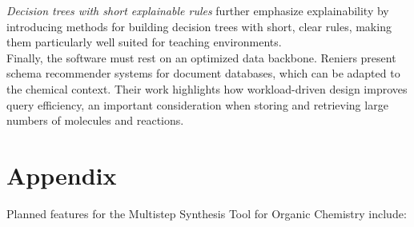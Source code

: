 \documentclass[12pt]{article}
\begin{document}
\textit{Decision trees with short explainable rules} further emphasize explainability by introducing methods for building decision trees with short, clear rules, making them particularly well suited for teaching environments. \cite{10.1016/j.tcs.2025.115344}
\\
\indent
Finally, the software must rest on an optimized data backbone. Reniers present schema recommender systems for document databases, which can be adapted to the chemical context. Their work highlights how workload-driven design improves query efficiency, an important consideration when storing and retrieving large numbers of molecules and reactions. \cite{10.1007/978-3-030-62522-1_35}



\newpage
\section*{Appendix}
Planned features for the Multistep Synthesis Tool for Organic Chemistry include:
\end{document}
